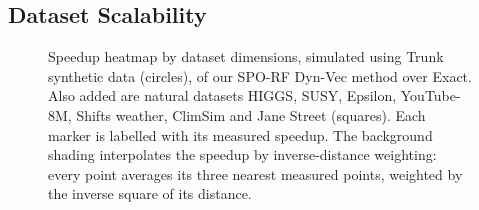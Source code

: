 \documentclass[sigconf,anonymous,review]{acmart}
\begin{document}



\subsection{Dataset Scalability}
\label{sec:res-scalability}

\begin{figure}[t]
    \centering
    
    \caption{Speedup heatmap by dataset dimensions, simulated using Trunk synthetic data (circles), of our SPO-RF Dyn-Vec method over Exact. Also added are natural datasets HIGGS, SUSY, Epsilon, YouTube-8M, Shifts weather, ClimSim and Jane Street (squares). Each marker is labelled
    with its measured speedup. The background shading interpolates the speedup by
    inverse-distance weighting: every point averages its three nearest measured points, weighted by the inverse square
    of its distance.}
    \label{fig:speedup-heatmap}
\end{figure}
\end{document}
